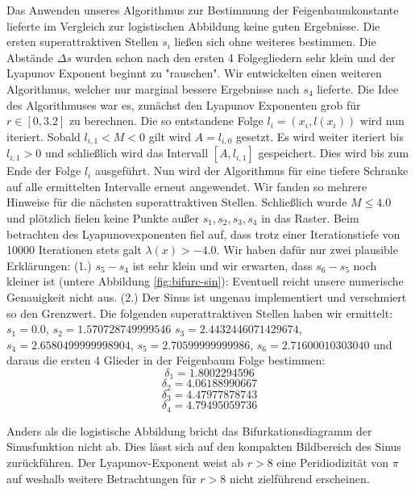 \documentclass[11,5pt, twoside]{article}
\begin{document}
Das Anwenden unseres Algorithmus zur Bestimmung der Feigenbaumkonstante lieferte im Vergleich zur logistischen Abbildung keine guten Ergebnisse. Die ersten superattraktiven Stellen $s_i$ ließen sich ohne weiteres bestimmen. Die Abstände $\Delta s$ wurden schon nach den ersten 4 Folgegliedern sehr klein und der Lyapunov Exponent beginnt zu "rauschen". 
Wir entwickelten einen weiteren Algorithmus, welcher nur marginal bessere Ergebnisse nach $s_4$ lieferte. Die Idee des Algorithmuses war es, zunächst den Lyapunov Exponenten grob für $r\in [0,3.2]$ zu berechnen. 
Die so entstandene Folge $l_i=(x_i, l(x_i))$ wird nun iteriert. Sobald $l_{i,1} < M < 0$ gilt wird $A=l_{i,0}$ gesetzt. Es wird weiter iteriert bis $l_{i,1} > 0$ und schließlich wird das Intervall $[A, l_{i,1}]$ gespeichert. Dies wird bis zum Ende der Folge $l_i$ ausgeführt. 
Nun wird der Algorithmus für eine tiefere Schranke auf alle ermittelten Intervalle erneut angewendet. 
Wir fanden so mehrere Hinweise für die nächsten superattraktiven Stellen. 
Schließlich wurde $M \leq 4.0$ und plötzlich fielen keine Punkte außer $s_1, s_2, s_3, s_4$ in das Raster. Beim betrachten des Lyapunovexponenten fiel auf, dass trotz einer Iterationstiefe von 10000 Iterationen stets galt $\lambda(x)>-4.0$. 
Wir haben dafür nur zwei plausible Erklärungen: 
(1.) $s_5-s_4$ ist sehr klein und wir erwarten, dass $s_6-s_5$ noch kleiner ist (untere Abbildung \ref{fig:bifurc-sin}): Eventuell reicht unsere numerische Genauigkeit nicht aus. 
(2.) Der Sinus ist ungenau implementiert und verschmiert so den Grenzwert. 
Die folgenden superattraktiven Stellen haben wir ermittelt: $s_1=0.0$, $s_2=1.570728749999546$ $s_3=2.4432446071429674$, $s_4=2.6580499999998904$, $s_5=2.70599999999986$, $s_6=2.71600010303040$ und daraus die ersten 4 Glieder in der Feigenbaum Folge bestimmen:
$$\delta_1=1.8002294596$$
$$\delta_2=4.06188990667$$
$$\delta_3=4.47977878743$$
$$\delta_4=4.79495059736$$

Anders als die logistische Abbildung bricht das Bifurkationsdiagramm der Sinusfunktion nicht ab. Dies lässt sich auf den kompakten Bildbereich des Sinus zurückführen. Der Lyapunov-Exponent weist ab $r>8$ eine Peridiodizität von $\pi$ auf weshalb weitere Betrachtungen für $r>8$ nicht zielführend erscheinen.
\end{document}
